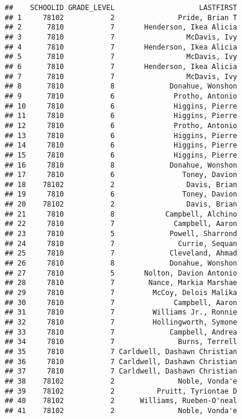 \documentclass[sfsidenotes, justified]{tufte-handout}\usepackage{graphicx, color}
\makeatletter
\newenvironment{kframe}{%
 \def\at@end@of@kframe{}%
 \ifinner\ifhmode%
  \def\at@end@of@kframe{\end{minipage}}%
  \begin{minipage}{\columnwidth}%
 \fi\fi%
 \def\FrameCommand##1{\hskip\@totalleftmargin \hskip-\fboxsep
 \colorbox{shadecolor}{##1}\hskip-\fboxsep
     \hskip-\linewidth \hskip-\@totalleftmargin \hskip\columnwidth}%
 \MakeFramed {\advance\hsize-\width
   \@totalleftmargin\z@ \linewidth\hsize
   \@setminipage}}%
 {\par\unskip\endMakeFramed%
 \at@end@of@kframe}
\newenvironment{knitrout}{}{} %
\makeatother
\begin{document}
\begin{knitrout}
\color{fgcolor}\begin{kframe}
\begin{verbatim}
##    SCHOOLID GRADE_LEVEL                    LASTFIRST
## 1     78102           2               Pride, Brian T
## 2      7810           7       Henderson, Ikea Alicia
## 3      7810           7                 McDavis, Ivy
## 4      7810           7       Henderson, Ikea Alicia
## 5      7810           7                 McDavis, Ivy
## 6      7810           7       Henderson, Ikea Alicia
## 7      7810           7                 McDavis, Ivy
## 8      7810           8             Donahue, Wonshon
## 9      7810           6              Protho, Antonio
## 10     7810           6              Higgins, Pierre
## 11     7810           6              Higgins, Pierre
## 12     7810           6              Protho, Antonio
## 13     7810           6              Higgins, Pierre
## 14     7810           6              Higgins, Pierre
## 15     7810           6              Higgins, Pierre
## 16     7810           8             Donahue, Wonshon
## 17     7810           6                Toney, Davion
## 18    78102           2                 Davis, Brian
## 19     7810           6                Toney, Davion
## 20    78102           2                 Davis, Brian
## 21     7810           8            Campbell, Alchino
## 22     7810           7              Campbell, Aaron
## 23     7810           5             Powell, Sharrond
## 24     7810           7               Currie, Sequan
## 25     7810           7             Cleveland, Ahmad
## 26     7810           8             Donahue, Wonshon
## 27     7810           5       Nolton, Davion Antonio
## 28     7810           7        Nance, Markia Marshae
## 29     7810           7         McCoy, Delois Malika
## 30     7810           7              Campbell, Aaron
## 31     7810           7         Williams Jr., Ronnie
## 32     7810           7         Hollingworth, Symone
## 33     7810           7             Campbell, Andrea
## 34     7810           7               Burns, Terrell
## 35     7810           7 Carldwell, Dashawn Christian
## 36     7810           7 Carldwell, Dashawn Christian
## 37     7810           7 Carldwell, Dashawn Christian
## 38    78102           2               Noble, Vonda'e
## 39    78102           2          Pruitt, Tyriontae D
## 40    78102           2      Williams, Rueben-O'neal
## 41    78102           2               Noble, Vonda'e
\end{verbatim}
\end{kframe}
\end{knitrout}
\end{document}
